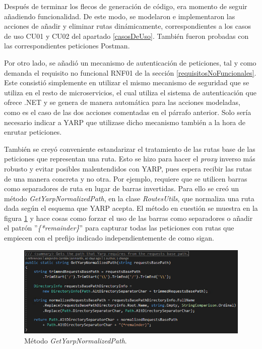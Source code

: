 \documentclass[11pt,spanish,listoffigures]{tfgetsinf}
\begin{document}
Después de terminar los flecos de generación de código, era momento de seguir añadiendo funcionalidad. De este modo, se modelaron e implementaron las acciones de añadir y eliminar rutas dinámicamente, correspondientes a los casos de uso CU01 y CU02 del apartado \ref{casosDeUso}. También fueron probadas con las correspondientes peticiones Postman.

Por otro lado, se añadió un mecanismo de autenticación de peticiones, tal y como demanda el requisito no funcional RNF01 de la sección \ref{requisitosNoFuncionales}. Este consistió simplemente en utilizar el mismo mecanismo de seguridad que se utiliza en el resto de microservicios, el cual utiliza el sistema de autenticación que ofrece .NET y se genera de manera automática para las acciones modeladas, como es el caso de las dos acciones comentadas en el párrafo anterior. Solo sería necesario indicar a YARP que utilizase dicho mecanismo también a la hora de enrutar peticiones.

También se creyó conveniente estandarizar el tratamiento de las rutas base de las peticiones que representan una ruta. Esto se hizo para hacer el \emph{proxy} inverso más robusto y evitar posibles malentendidos con YARP, pues espera recibir las rutas de una manera concreta y no otra. Por ejemplo, requiere que se utilicen barras como separadores de ruta en lugar de barras invertidas. Para ello se creó un método \emph{GetYarpNormalizedPath}, en la clase \emph{RoutesUtils}, que normaliza una ruta dada según el esquema que YARP acepta. El método en cuestión se muestra en la figura \ref{getYarpNormalizedPath} y hace cosas como forzar el uso de las barras como separadores o añadir el patrón ''\emph{\{*remainder\}}'' para capturar todas las peticiones con rutas que empiecen con el prefijo indicado independientemente de como sigan.

\begin{figure}[H] %
\centering
\includegraphics[width=1\textwidth]{imagenes/getYarpNormalizedPath}
\caption{Método \emph{GetYarpNormalizedPath}.}
	\label{getYarpNormalizedPath}
\end{figure}
\end{document}
